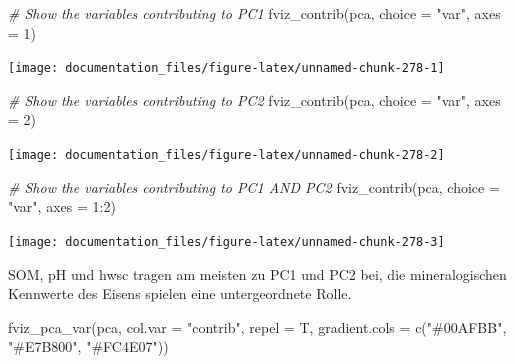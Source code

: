 \documentclass[
]{article}
\newenvironment{Shaded}{\begin{snugshade}}{\end{snugshade}}
\newcommand{\AttributeTok}[1]{\textcolor[rgb]{0.77,0.63,0.00}{#1}}
\newcommand{\CommentTok}[1]{\textcolor[rgb]{0.56,0.35,0.01}{\textit{#1}}}
\newcommand{\DecValTok}[1]{\textcolor[rgb]{0.00,0.00,0.81}{#1}}
\newcommand{\FunctionTok}[1]{\textcolor[rgb]{0.00,0.00,0.00}{#1}}
\newcommand{\NormalTok}[1]{#1}
\newcommand{\SpecialCharTok}[1]{\textcolor[rgb]{0.00,0.00,0.00}{#1}}
\newcommand{\StringTok}[1]{\textcolor[rgb]{0.31,0.60,0.02}{#1}}
\begin{document}
\begin{Shaded}
\begin{Highlighting}[]
\CommentTok{\# Show the variables contributing to PC1}
\FunctionTok{fviz\_contrib}\NormalTok{(pca, }\AttributeTok{choice =} \StringTok{"var"}\NormalTok{, }\AttributeTok{axes =} \DecValTok{1}\NormalTok{)}
\end{Highlighting}
\end{Shaded}

\begin{center}\texttt{[image: documentation\_files/figure-latex/unnamed-chunk-278-1]} \end{center}

\begin{Shaded}
\begin{Highlighting}[]

\CommentTok{\# Show the variables contributing to PC2}
\FunctionTok{fviz\_contrib}\NormalTok{(pca, }\AttributeTok{choice =} \StringTok{"var"}\NormalTok{, }\AttributeTok{axes =} \DecValTok{2}\NormalTok{)}
\end{Highlighting}
\end{Shaded}

\begin{center}\texttt{[image: documentation\_files/figure-latex/unnamed-chunk-278-2]} \end{center}

\begin{Shaded}
\begin{Highlighting}[]

\CommentTok{\# Show the variables contributing to PC1 AND PC2}
\FunctionTok{fviz\_contrib}\NormalTok{(pca, }\AttributeTok{choice =} \StringTok{"var"}\NormalTok{, }\AttributeTok{axes =} \DecValTok{1}\SpecialCharTok{:}\DecValTok{2}\NormalTok{)}
\end{Highlighting}
\end{Shaded}

\begin{center}\texttt{[image: documentation\_files/figure-latex/unnamed-chunk-278-3]} \end{center}

SOM, pH und hwsc tragen am meisten zu PC1 und PC2 bei, die mineralogischen Kennwerte des Eisens spielen eine untergeordnete Rolle.

\begin{Shaded}
\begin{Highlighting}[]

\FunctionTok{fviz\_pca\_var}\NormalTok{(pca, }\AttributeTok{col.var =} \StringTok{"contrib"}\NormalTok{, }\AttributeTok{repel =}\NormalTok{ T, }\AttributeTok{gradient.cols =} \FunctionTok{c}\NormalTok{(}\StringTok{"\#00AFBB"}\NormalTok{, }\StringTok{"\#E7B800"}\NormalTok{, }\StringTok{"\#FC4E07"}\NormalTok{))}
\end{Highlighting}
\end{Shaded}
\end{document}
